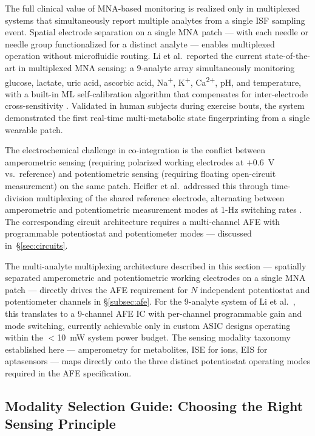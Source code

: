 \documentclass[review,1p]{elsarticle}
\begin{document}
The full clinical value of MNA-based monitoring is realized only in multiplexed systems that simultaneously report multiple analytes from a single ISF sampling event. Spatial electrode separation on a single MNA patch — with each needle or needle group functionalized for a distinct analyte — enables multiplexed operation without microfluidic routing. Li et al.\ reported the current state-of-the-art in multiplexed MNA sensing: a 9-analyte array simultaneously monitoring glucose, lactate, uric acid, ascorbic acid, Na\textsuperscript{+}, K\textsuperscript{+}, Ca\textsuperscript{2+}, pH, and temperature, with a built-in ML self-calibration algorithm that compensates for inter-electrode cross-sensitivity \cite{Li2025Innovation}. Validated in human subjects during exercise bouts, the system demonstrated the first real-time multi-metabolic state fingerprinting from a single wearable patch.

The electrochemical challenge in co-integration is the conflict between amperometric sensing (requiring polarized working electrodes at $+0.6$~V vs.\ reference) and potentiometric sensing (requiring floating open-circuit measurement) on the same patch. Heifler et al.\ addressed this through time-division multiplexing of the shared reference electrode, alternating between amperometric and potentiometric measurement modes at 1-Hz switching rates \cite{Heifler2021}. The corresponding circuit architecture requires a multi-channel AFE with programmable potentiostat and potentiometer modes — discussed in~\S\ref{sec:circuits}.

The multi-analyte multiplexing architecture described in this section — spatially separated amperometric and potentiometric working electrodes on a single MNA patch — directly drives the AFE requirement for $N$ independent potentiostat and potentiometer channels in \S\ref{subsec:afe}. For the 9-analyte system of Li et al.\ \cite{Li2025Innovation}, this translates to a 9-channel AFE IC with per-channel programmable gain and mode switching, currently achievable only in custom ASIC designs operating within the $<$10~mW system power budget. The sensing modality taxonomy established here — amperometry for metabolites, ISE for ions, EIS for aptasensors — maps directly onto the three distinct potentiostat operating modes required in the AFE specification.

\subsection{Modality Selection Guide: Choosing the Right Sensing Principle}
\label{subsec:modality_guide}
\end{document}

